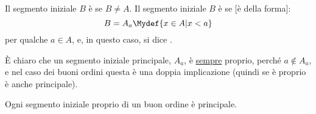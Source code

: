\documentclass[11pt]{scrartcl}
\begin{document}
\begin{definition}
	Il segmento iniziale $B$ è  se $B \ne A$. Il segmento iniziale $B$ è  se [è della forma]:
	\[ B = A_a \Mydef \{x \in A | x < a\}
		\]
	per qualche $a \in A$, e, in questo caso, si dice .
\end{definition}

È chiaro che un segmento iniziale principale, $A_a$, è \underline{sempre} proprio, perché $a \not \in A_a$, e nel caso dei buoni ordini questa è una doppia implicazione (quindi se è proprio è 
anche principale).

\begin{proposition}
	Ogni segmento iniziale proprio di un buon ordine è principale.
\end{proposition}
\end{document}
